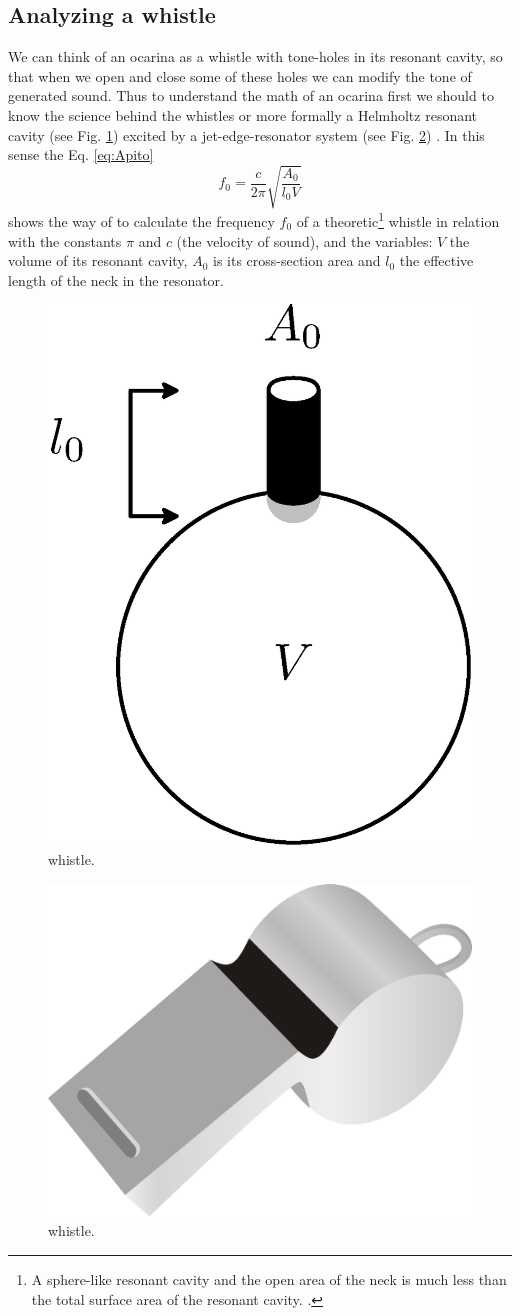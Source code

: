 \documentclass[11pt,twocolumn]{article}
\begin{document}
\subsection{Analyzing a whistle}
We can think of an ocarina as a whistle with tone-holes in its resonant cavity,
so that when we open and close some of these holes we can modify the tone of generated sound.
Thus to understand the math of an ocarina first we should to know the science behind the whistles  
or more formally a Helmholtz resonant cavity \cite{corning2011resonance} (see Fig. \ref{fig:resonador}) excited by a jet-edge-resonator system (see Fig. \ref{football-referee-whistle}) \cite[pp. 3]{gibiat2013acoustic} \cite[pp. 138]{nyborg1953characteristics}. 
In this sense the Eq. \ref{eq:Apito} 
\begin{equation} 
\label{eq:Apito}
 f_0 = \frac{c}{2 \pi} \sqrt{\frac{A_{0}}{l_{0}V} }  
\end{equation}
shows the way of to calculate the frequency $f_0$ of a theoretic\footnote{A sphere-like resonant cavity and the open area of the neck is much less than the total surface area of the resonant cavity. .} whistle \cite[pp. 3]{gibiat2013acoustic} \cite[pp. 5]{kobayashi20093d} \cite[pp. 265]{okadanumerical}
in relation with the constants $\pi$  and $c$ (the velocity of sound),  and 
the variables: $V$ the volume of its resonant cavity,
$A_0$ is its cross-section area and $l_0$ the effective length of the neck in the resonator.


\begin{figure}[ht!]
\centering
\includegraphics[width=0.350\columnwidth]{resonador.eps}
\caption{whistle. }
\label{fig:resonador}
\end{figure}

\begin{figure}[ht!]
\centering
\includegraphics[width=0.250\columnwidth]{football-referee-whistle.eps}
\caption{whistle. }
\label{football-referee-whistle}
\end{figure}
\end{document}
